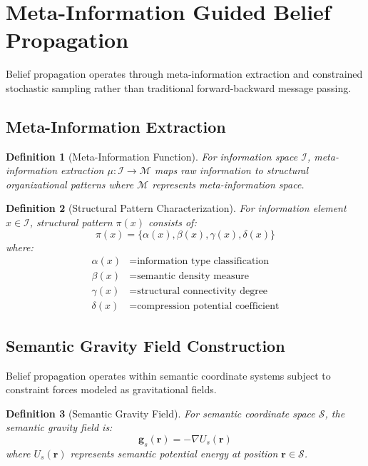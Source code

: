 \documentclass[12pt,a4paper]{article}
\newtheorem{definition}{Definition}
\begin{document}
\section{Meta-Information Guided Belief Propagation}

Belief propagation operates through meta-information extraction and constrained stochastic sampling rather than traditional forward-backward message passing.

\subsection{Meta-Information Extraction}

\begin{definition}[Meta-Information Function]
For information space $\mathcal{I}$, meta-information extraction $\mu: \mathcal{I} \rightarrow \mathcal{M}$ maps raw information to structural organizational patterns where $\mathcal{M}$ represents meta-information space.
\end{definition}

\begin{definition}[Structural Pattern Characterization]
For information element $x \in \mathcal{I}$, structural pattern $\pi(x)$ consists of:
\begin{equation}
\pi(x) = \{\alpha(x), \beta(x), \gamma(x), \delta(x)\}
\end{equation}
where:
\begin{align}
\alpha(x) &= \text{information type classification} \\
\beta(x) &= \text{semantic density measure} \\
\gamma(x) &= \text{structural connectivity degree} \\
\delta(x) &= \text{compression potential coefficient}
\end{align}
\end{definition}

\subsection{Semantic Gravity Field Construction}

Belief propagation operates within semantic coordinate systems subject to constraint forces modeled as gravitational fields.

\begin{definition}[Semantic Gravity Field]
For semantic coordinate space $\mathcal{S}$, the semantic gravity field is:
\begin{equation}
\mathbf{g}_s(\mathbf{r}) = -\nabla U_s(\mathbf{r})
\end{equation}
where $U_s(\mathbf{r})$ represents semantic potential energy at position $\mathbf{r} \in \mathcal{S}$.
\end{definition}
\end{document}
